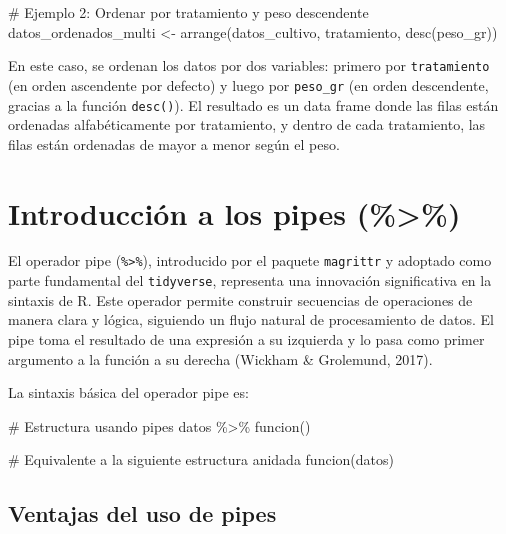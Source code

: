 \documentclass[
  spanish,
  a4paper,
  DIV=11,
  numbers=noendperiod,
  onepage,
  openany]{scrreprt}
\newenvironment{Shaded}{\begin{snugshade}}{\end{snugshade}}
\newcommand{\CommentTok}[1]{\textcolor[rgb]{0.37,0.37,0.37}{#1}}
\newcommand{\FunctionTok}[1]{\textcolor[rgb]{0.28,0.35,0.67}{#1}}
\newcommand{\NormalTok}[1]{\textcolor[rgb]{0.00,0.23,0.31}{#1}}
\newcommand{\OtherTok}[1]{\textcolor[rgb]{0.00,0.23,0.31}{#1}}
\newcommand{\SpecialCharTok}[1]{\textcolor[rgb]{0.37,0.37,0.37}{#1}}
\begin{document}
\begin{Shaded}
\begin{Highlighting}[]
\CommentTok{\# Ejemplo 2: Ordenar por tratamiento y peso descendente}
\NormalTok{datos\_ordenados\_multi }\OtherTok{\textless{}{-}} \FunctionTok{arrange}\NormalTok{(datos\_cultivo, }
\NormalTok{                                 tratamiento, }
                                 \FunctionTok{desc}\NormalTok{(peso\_gr))}
\end{Highlighting}
\end{Shaded}

En este caso, se ordenan los datos por dos variables: primero por
\texttt{tratamiento} (en orden ascendente por defecto) y luego por
\texttt{peso\_gr} (en orden descendente, gracias a la función
\texttt{desc()}). El resultado es un data frame donde las filas están
ordenadas alfabéticamente por tratamiento, y dentro de cada tratamiento,
las filas están ordenadas de mayor a menor según el peso.

\section{Introducción a los pipes
(\%\textgreater\%)}\label{introducciuxf3n-a-los-pipes}

El operador pipe (\texttt{\%\textgreater{}\%}), introducido por el
paquete \texttt{magrittr} y adoptado como parte fundamental del
\texttt{tidyverse}, representa una innovación significativa en la
sintaxis de R. Este operador permite construir secuencias de operaciones
de manera clara y lógica, siguiendo un flujo natural de procesamiento de
datos. El pipe toma el resultado de una expresión a su izquierda y lo
pasa como primer argumento a la función a su derecha (Wickham \&
Grolemund, 2017).

La sintaxis básica del operador pipe es:

\begin{Shaded}
\begin{Highlighting}[]
\CommentTok{\# Estructura usando pipes}
\NormalTok{datos }\SpecialCharTok{\%\textgreater{}\%} \FunctionTok{funcion}\NormalTok{()}

\CommentTok{\# Equivalente a la siguiente estructura anidada}
\FunctionTok{funcion}\NormalTok{(datos)}
\end{Highlighting}
\end{Shaded}

\subsection{Ventajas del uso de pipes}\label{ventajas-del-uso-de-pipes}
\end{document}
